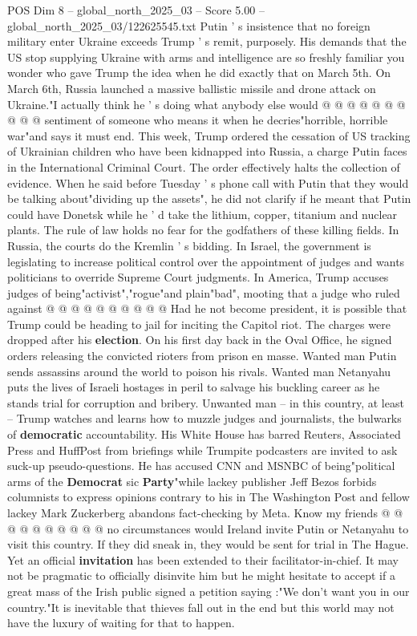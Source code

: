 \begin{textsample}{POS Dim 8 – global\_north\_2025\_03 – Score 5.00 – global\_north\_2025\_03/122625545.txt}
Putin ' s insistence that no foreign military enter Ukraine exceeds Trump ' s remit, purposely.
His demands that the US stop supplying Ukraine with arms and intelligence are so freshly familiar you wonder who gave Trump the idea when he did exactly that on March 5th.
On March 6th, Russia launched a massive ballistic missile and drone attack on Ukraine."I actually think he ' s doing what anybody else would @ @ @ @ @ @ @ @ @ @ sentiment of someone who means it when he decries"horrible, horrible war"and says it must end.
This week, Trump ordered the cessation of US tracking of Ukrainian children who have been kidnapped into Russia, a charge Putin faces in the International Criminal Court.
The order effectively halts the collection of evidence.
When he said before Tuesday ' s phone call with Putin that they would be talking about"dividing up the assets", he did not clarify if he meant that Putin could have Donetsk while he ' d take the lithium, copper, titanium and nuclear plants.
The rule of law holds no fear for the godfathers of these killing fields.
In Russia, the courts do the Kremlin ' s bidding.
In Israel, the government is legislating to increase political control over the appointment of judges and wants politicians to override Supreme Court judgments.
In America, Trump accuses judges of being"activist","rogue"and plain"bad", mooting that a judge who ruled against @ @ @ @ @ @ @ @ @ @ Had he not become president, it is possible that Trump could be heading to jail for inciting the Capitol riot.
The charges were dropped after his \textbf{election}.
On his first day back in the Oval Office, he signed orders releasing the convicted rioters from prison en masse.
Wanted man Putin sends assassins around the world to poison his rivals.
Wanted man Netanyahu puts the lives of Israeli hostages in peril to salvage his buckling career as he stands trial for corruption and bribery.
Unwanted man -- in this country, at least -- Trump watches and learns how to muzzle judges and journalists, the bulwarks of \textbf{democratic} accountability.
His White House has barred Reuters, Associated Press and HuffPost from briefings while Trumpite podcasters are invited to ask suck-up pseudo-questions.
He has accused CNN and MSNBC of being"political arms of the \textbf{Democrat} sic \textbf{Party}"while lackey publisher Jeff Bezos forbids columnists to express opinions contrary to his in The Washington Post and fellow lackey Mark Zuckerberg abandons fact-checking by Meta.
Know my friends @ @ @ @ @ @ @ @ @ @ no circumstances would Ireland invite Putin or Netanyahu to visit this country.
If they did sneak in, they would be sent for trial in The Hague.
Yet an official \textbf{invitation} has been extended to their facilitator-in-chief.
It may not be pragmatic to officially disinvite him but he might hesitate to accept if a great mass of the Irish public signed a petition saying :"We don't want you in our country."It is inevitable that thieves fall out in the end but this world may not have the luxury of waiting for that to happen.

\end{textsample}
